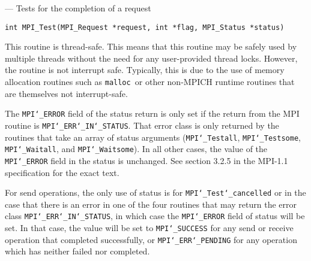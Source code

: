 \startmanpage
{}
--- Tests for the completion of a request 
\startvb\begin{verbatim}
int MPI_Test(MPI_Request *request, int *flag, MPI_Status *status)

\end{verbatim}
\endvb

\par
{}
\par
{}
\par
This routine is thread-safe.  This means that this routine may be
safely used by multiple threads without the need for any user-provided
thread locks.  However, the routine is not interrupt safe.  Typically,
this is due to the use of memory allocation routines such as {\tt malloc
}or other non-MPICH runtime routines that are themselves not interrupt-safe.
\par
{}
\par
The {\tt MPI{\tt \char`\_}ERROR} field of the status return is only set if
the return from the MPI routine is {\tt MPI{\tt \char`\_}ERR{\tt \char`\_}IN{\tt \char`\_}STATUS}.  That error class
is only returned by the routines that take an array of status arguments
({\tt MPI{\tt \char`\_}Testall}, {\tt MPI{\tt \char`\_}Testsome}, {\tt MPI{\tt \char`\_}Waitall}, and {\tt MPI{\tt \char`\_}Waitsome}).  In
all other cases, the value of the {\tt MPI{\tt \char`\_}ERROR} field in the status is
unchanged.  See section 3.2.5 in the MPI-1.1 specification for the
exact text.
\par
For send operations, the only use of status is for {\tt MPI{\tt \char`\_}Test{\tt \char`\_}cancelled} or
in the case that there is an error in one of the four routines that
may return the error class {\tt MPI{\tt \char`\_}ERR{\tt \char`\_}IN{\tt \char`\_}STATUS}, in which case the
{\tt MPI{\tt \char`\_}ERROR} field of status will be set.  In that case, the value
will be set to {\tt MPI{\tt \char`\_}SUCCESS} for any send or receive operation that completed
successfully, or {\tt MPI{\tt \char`\_}ERR{\tt \char`\_}PENDING} for any operation which has neither
failed nor completed.
\par
